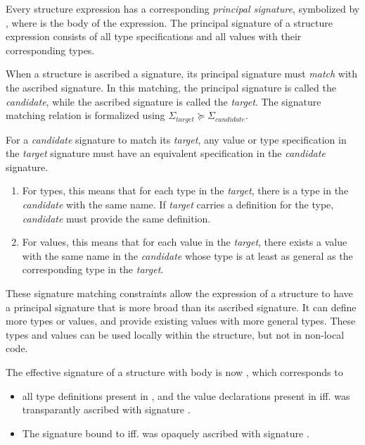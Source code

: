 Every structure expression has a corresponding \emph{principal signature}, symbolized by , where  is the body of the  expression.
The principal signature of a structure expression consists of all type specifications and all values with their corresponding types.

When a structure is ascribed a signature, its principal signature must \emph{match} with the ascribed signature.
In this matching, the principal signature is called the \emph{candidate}, while the ascribed signature is called the \emph{target}.
The signature matching relation is formalized using $\mathit{\Sigma_{target}}\succeq\mathit{\Sigma_{candidate}}$.

For a \emph{candidate} signature to match its \emph{target}, any value or type specification in the \emph{target} signature must have an equivalent specification in the \emph{candidate} signature.
\begin{enumerate}
\item For types, this means that for each type in the \emph{target}, there is a type in the \emph{candidate} with the same name.
If \emph{target} carries a definition for the type, \emph{candidate} must provide the same definition.
\item For values, this means that for each value in the \emph{target}, there exists a value with the same name in the \emph{candidate} whose type is at least as general as the corresponding type in the \emph{target}.
\end{enumerate}

These signature matching constraints allow the expression of a structure to have a principal signature that is more broad than its ascribed signature.
It can define more types or values, and provide existing values with more general types.
These types and values can be used locally within the structure, but not in non-local code.

The effective signature of a structure  with body  is now , which corresponds to
\begin{itemize}
\item all type definitions present in , and the value declarations present in  iff.  was transparantly ascribed with signature .
\item The signature bound to  iff.  was opaquely ascribed with signature .
\end{itemize}


